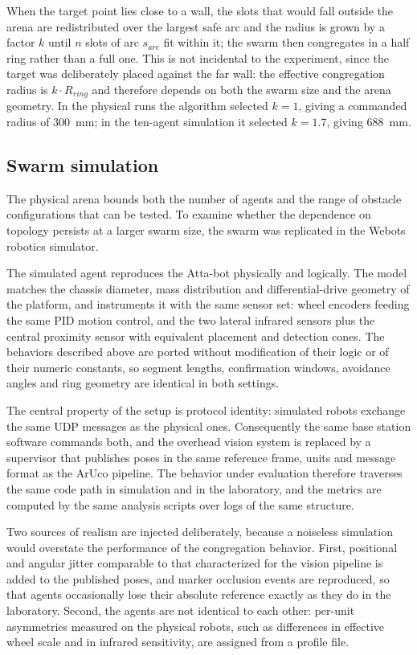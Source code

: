 \documentclass[conference]{IEEEtran}
\begin{document}
When the target point lies close to a wall, the slots that would fall outside
the arena are redistributed over the largest safe arc and the radius is grown by
a factor $k$ until $n$ slots of arc $s_{arc}$ fit within it; the swarm then
congregates in a half ring rather than a full one. This is not incidental to the
experiment, since the target was deliberately placed against the far wall: the
effective congregation radius is $k \cdot R_{ring}$ and therefore depends on both
the swarm size and the arena geometry. In the physical runs the algorithm
selected $k = 1$, giving a commanded radius of $300$~mm; in the ten-agent
simulation it selected $k = 1.7$, giving $688$~mm.

\subsection{Swarm simulation}

The physical arena bounds both the number of agents and the range of obstacle
configurations that can be tested. To examine whether the dependence on topology
persists at a larger swarm size, the swarm was replicated in the Webots robotics
simulator.

The simulated agent reproduces the Atta-bot physically and logically. The model
matches the chassis diameter, mass distribution and differential-drive geometry
of the platform, and instruments it with the same sensor set: wheel encoders
feeding the same PID motion control, and the two lateral infrared sensors plus
the central proximity sensor with equivalent placement and detection cones. The behaviors described above are
ported without modification of their logic or of their numeric constants, so
segment lengths, confirmation windows, avoidance angles and ring geometry are
identical in both settings.

The central property of the setup is protocol identity: simulated robots
exchange the same UDP messages as the physical ones. Consequently the same base
station software commands both, and the overhead vision system is replaced by a
supervisor that publishes poses in the same reference frame, units and message
format as the ArUco pipeline. The behavior under evaluation therefore traverses
the same code path in simulation and in the laboratory, and the metrics are
computed by the same analysis scripts over logs of the same structure.

Two sources of realism are injected deliberately, because a noiseless simulation
would overstate the performance of the congregation behavior. First, positional
and angular jitter comparable to that characterized for the vision pipeline is
added to the published poses, and marker occlusion events are reproduced, so
that agents occasionally lose their absolute reference exactly as they do in the
laboratory. Second, the agents are not identical to each other: per-unit
asymmetries measured on the physical robots, such as differences in effective
wheel scale and in infrared sensitivity, are assigned from a profile file.
\end{document}
